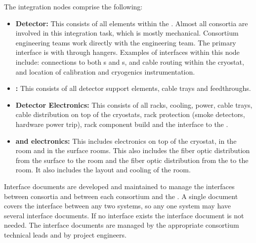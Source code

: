 The integration nodes comprise the following:
\begin{itemize}
\item {\bf Detector:} This consists of all  elements within
  the . Almost all consortia are involved in this
  integration task, which is mostly mechanical. Consortium engineering
  teams work directly with the  engineering team.  The
  primary interface is with  through hangers. Examples of
  interfaces within this node include:  connections to both
  s and s,  and  cable
  routing within the cryostat, and location of calibration and
  cryogenics instrumentation.
\item {\bf {}:} This consists of all detector support elements,
  cable trays and feedthroughs.
\item {\bf Detector Electronics:} This consists of all racks, cooling,
  power, cable trays, cable distribution on top of the cryostats, rack
  protection (smoke detectors, hardware power trip), rack component
  build and the interface to the .
\item {\bf {} and electronics:} This includes electronics on
  top of the cryostat, in the  room and in the surface
  rooms. This also includes the fiber optic distribution from the
  surface to the  room and the fiber optic distribution
  from the  to the  room. It also includes the
  layout and cooling of the  room.
\end{itemize}

Interface documents are developed and maintained to manage the
interfaces %
between consortia and between %
each consortium and the  . A
single document covers the interface between any two systems, so any
one system may have several interface documents. If no interface
exists the interface document is not needed.  The
interface documents are managed by %
the appropriate consortium technical leads
and by  project engineers.

